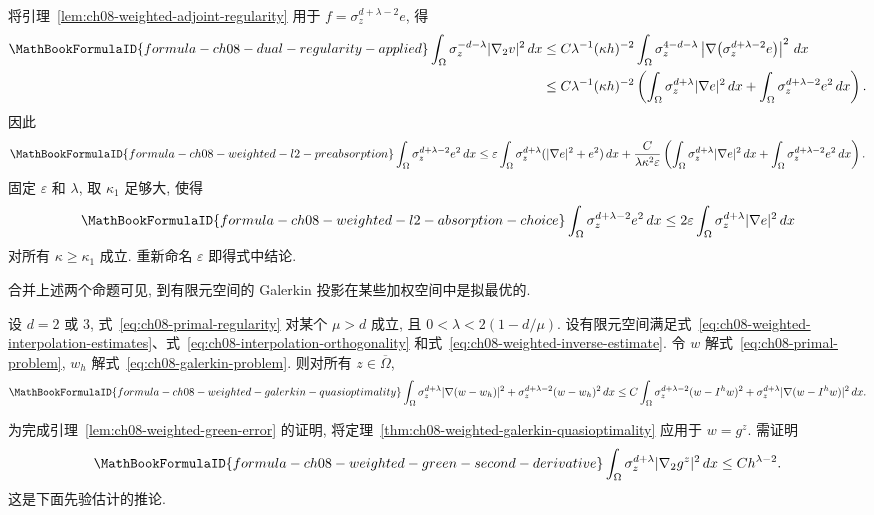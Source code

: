 \begin{Proof}
将引理~\ref{lem:ch08-weighted-adjoint-regularity} 用于 $f=\sigma_z^{d+\lambda-2}e$, 得
\begin{align*}
\MathBookFormulaID{formula-ch08-dual-regularity-applied}
\int_\Omega\sigma_z^{-d-\lambda}|\nabla_2v|^2\,dx
&\leq C\lambda^{-1}(\kappa h)^{-2}
\int_\Omega\sigma_z^{4-d-\lambda}
\left|\nabla\bigl(\sigma_z^{d+\lambda-2}e\bigr)\right|^2\,dx\\
&\leq C\lambda^{-1}(\kappa h)^{-2}
\left(\int_\Omega\sigma_z^{d+\lambda}|\nabla e|^2\,dx
+\int_\Omega\sigma_z^{d+\lambda-2}e^2\,dx\right).
\end{align*}
因此
\[
\MathBookFormulaID{formula-ch08-weighted-l2-preabsorption}
\int_\Omega\sigma_z^{d+\lambda-2}e^2\,dx
\leq\varepsilon\int_\Omega\sigma_z^{d+\lambda}(|\nabla e|^2+e^2)\,dx
+\frac{C}{\lambda\kappa^2\varepsilon}
\left(\int_\Omega\sigma_z^{d+\lambda}|\nabla e|^2\,dx
+\int_\Omega\sigma_z^{d+\lambda-2}e^2\,dx\right).
\]
固定 $\varepsilon$ 和 $\lambda$, 取 $\kappa_1$ 足够大, 使得
\begin{equation}
\MathBookFormulaID{formula-ch08-weighted-l2-absorption-choice}
\label{eq:ch08-weighted-l2-absorption-choice}
\int_\Omega\sigma_z^{d+\lambda-2}e^2\,dx
\leq2\varepsilon\int_\Omega\sigma_z^{d+\lambda}|\nabla e|^2\,dx
\end{equation}
对所有 $\kappa\geq\kappa_1$ 成立. 重新命名 $\varepsilon$ 即得式中结论.
\end{Proof}

合并上述两个命题可见, 到有限元空间的 Galerkin 投影在某些加权空间中是拟最优的.

\begin{Theorem}
\label{thm:ch08-weighted-galerkin-quasioptimality}
设 $d=2$ 或 $3$, 式~\eqref{eq:ch08-primal-regularity} 对某个 $\mu>d$ 成立, 且 $0<\lambda<2(1-d/\mu)$. 设有限元空间满足式~\eqref{eq:ch08-weighted-interpolation-estimates}、式~\eqref{eq:ch08-interpolation-orthogonality} 和式~\eqref{eq:ch08-weighted-inverse-estimate}. 令 $w$ 解式~\eqref{eq:ch08-primal-problem}, $w_h$ 解式~\eqref{eq:ch08-galerkin-problem}. 则对所有 $z\in\overline\Omega$,
\[
\MathBookFormulaID{formula-ch08-weighted-galerkin-quasioptimality}
\int_\Omega\sigma_z^{d+\lambda}|\nabla(w-w_h)|^2+\sigma_z^{d+\lambda-2}(w-w_h)^2\,dx
\leq C\int_\Omega\sigma_z^{d+\lambda-2}(w-I^hw)^2
+\sigma_z^{d+\lambda}|\nabla(w-I^hw)|^2\,dx.
\]
\end{Theorem}

为完成引理~\ref{lem:ch08-weighted-green-error} 的证明, 将定理~\ref{thm:ch08-weighted-galerkin-quasioptimality} 应用于 $w=g^z$. 需证明
\begin{equation}
\MathBookFormulaID{formula-ch08-weighted-green-second-derivative}
\label{eq:ch08-weighted-green-second-derivative}
\int_\Omega\sigma_z^{d+\lambda}|\nabla_2g^z|^2\,dx\leq Ch^{\lambda-2}.
\end{equation}
这是下面先验估计的推论.

